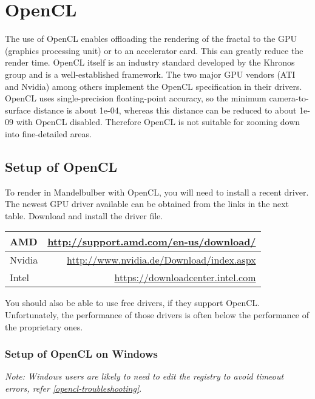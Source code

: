 

\section{OpenCL}\label{opencl}

The use of OpenCL  enables offloading the rendering of the fractal to the
GPU (graphics processing unit) or to an accelerator card. This can greatly reduce the render time.
OpenCL itself is an industry standard developed by the Khronos group and
is a well-established framework. The two major GPU vendors (ATI and Nvidia)
among others implement the OpenCL specification in their drivers.
OpenCL uses single-precision floating-point accuracy, so the minimum camera-to-surface distance is about 1e-04, whereas this distance can be reduced to about 1e-09 with OpenCL disabled. Therefore OpenCL is not suitable for zooming down into fine-detailed areas.

\subsection{Setup of OpenCL}\label{setup-opencl}
To render in Mandelbulber with OpenCL, you will need to install a recent driver.
The newest GPU driver available can be obtained from the links in the next table. Download and install the driver file.

\begin{center}
	\begin{tabular}{ | l | r | }
		\hline
		AMD 	&
		\href{http://support.amd.com/en-us/download/}{http://support.amd.com/en-us/download/}
		\\ \hline
		Nvidia 	& 
		\href{http://www.nvidia.de/Download/index.aspx}{http://www.nvidia.de/Download/index.aspx}
		\\ \hline
		Intel	&
		\href{https://downloadcenter.intel.com}{https://downloadcenter.intel.com}
		\\ \hline
	\end{tabular}
\end{center}

You should also be able to use free drivers, if they support OpenCL.
Unfortunately, the performance of those drivers is often below the performance of the proprietary ones.

\subsubsection{Setup of OpenCL on Windows}\label{setup-opencl-windows}
\emph{Note: Windows users are likely to need to edit the registry to avoid timeout errors, refer \ref{opencl-troubleshooting}}.

